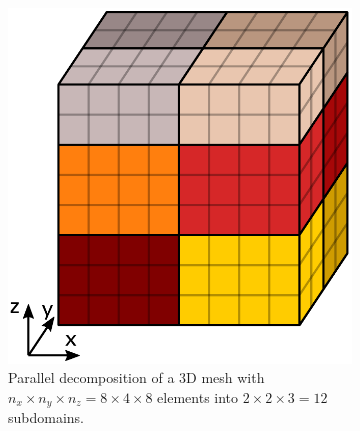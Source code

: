 \begin{figure}%
  \centering%
  \begin{subfigure}[t]{0.5\textwidth}%
    \centering%
    \includegraphics[width=\textwidth]{images/fiber_creation/decomposition.pdf}%
    \caption{Parallel decomposition of a 3D mesh with $n_x \times n_y \times n_z = 8 \times 4 \times 8$ elements into $2 \times 2 \times 3=12$ subdomains.}%
    \label{fig:fiber_creation_decomposition}%
  \end{subfigure}
  \quad
  \begin{subfigure}[t]{0.45\textwidth}%
    \centering%

\end{subfigure}
\end{figure}
